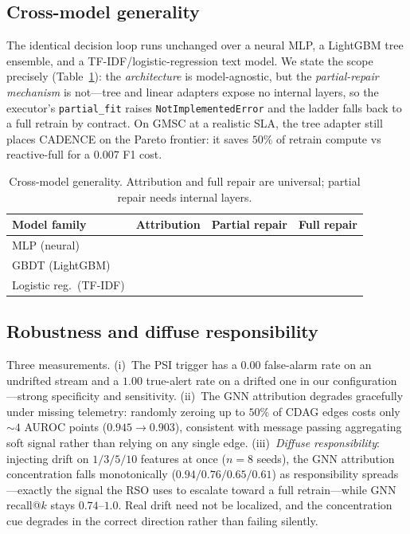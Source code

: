 \documentclass[conference]{IEEEtran}
\newcommand{\yes}{\textcolor{black}{\ding{51}}}
\newcommand{\no}{\textcolor{gray}{\ding{55}}}
\begin{document}
\subsection{Cross-model generality}\label{sec:generality}
The identical decision loop runs unchanged over a neural MLP, a LightGBM
tree ensemble, and a TF-IDF/logistic-regression text model. We state the
scope precisely (Table~\ref{tab:generality}): the \emph{architecture} is
model-agnostic, but the \emph{partial-repair mechanism} is not---tree and
linear adapters expose no internal layers, so the executor's
\texttt{partial\_fit} raises \texttt{NotImplementedError} and the ladder
falls back to a full retrain by contract. On GMSC at a realistic SLA, the
tree adapter still places CADENCE on the Pareto frontier: it saves $50\%$
of retrain compute vs reactive-full for a $0.007$ F1 cost.

\begin{table}[t]
\centering
\caption{Cross-model generality. Attribution and full repair are
universal; partial repair needs internal layers.}
\label{tab:generality}
\setlength{\tabcolsep}{6pt}
\begin{tabular}{@{}lccc@{}}
\toprule
\textbf{Model family} & \textbf{Attribution} & \textbf{Partial repair} & \textbf{Full repair}\\
\midrule
MLP (neural)             & \yes & \yes & \yes\\
GBDT (LightGBM)          & \yes & \no  & \yes\\
Logistic reg.\ (TF-IDF)  & \yes & \no  & \yes\\
\bottomrule
\end{tabular}
\end{table}

\subsection{Robustness and diffuse responsibility}\label{sec:robustness}
Three measurements. (i)~The PSI trigger
has a $0.00$ false-alarm rate on an undrifted stream and a $1.00$
true-alert rate on a drifted one in our configuration---strong
specificity and sensitivity. (ii)~The GNN attribution degrades gracefully
under missing telemetry: randomly zeroing up to $50\%$ of CDAG edges costs
only $\sim4$ AUROC points ($0.945\to0.903$), consistent with message
passing aggregating soft signal rather than relying on any single edge.
(iii)~\emph{Diffuse responsibility}: injecting drift on $1/3/5/10$ features
at once ($n{=}8$ seeds), the GNN attribution concentration falls
monotonically ($0.94/0.76/0.65/0.61$) as responsibility spreads---exactly
the signal the RSO uses to escalate toward a full retrain---while GNN
recall@$k$ stays $0.74$--$1.0$. Real drift need not be localized, and the
concentration cue degrades in the correct direction rather than failing
silently.
\end{document}
